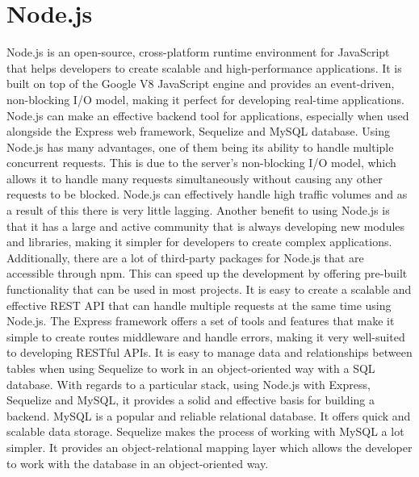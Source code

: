 \section{Node.js}
Node.js is an open-source, cross-platform runtime environment for JavaScript that helps developers to create scalable and high-performance applications. \cite{node} It is built on top of the Google V8 JavaScript engine and provides an event-driven, non-blocking I/O model, making it perfect for developing real-time applications. Node.js can make an effective backend tool for applications, especially when used alongside the Express web framework, Sequelize and MySQL database.
\newline \newline
Using Node.js has many advantages, \cite{nodePro&Cons} one of them being its ability to handle multiple concurrent requests. This is due to the server’s non-blocking I/O model, which allows it to handle many requests simultaneously without causing any other requests to be blocked. Node.js can effectively handle high traffic volumes and as a result of this there is very little lagging. Another benefit to using Node.js is that it has a large and active community that is always developing new modules and libraries, making it simpler for developers to create complex applications. Additionally, there are a lot of third-party packages for Node.js that are accessible through npm. This can speed up the development by offering pre-built functionality that can be used in most projects.
\newline \newline
It is easy to create a scalable and effective REST API that can handle multiple requests at the same time using Node.js. The Express framework offers a set of tools and features that make it simple to create routes middleware and handle errors, making it very well-suited to developing RESTful APIs. It is easy to manage data and relationships between tables when using Sequelize to work in an object-oriented way with a SQL database. With regards to a particular stack, using Node.js with Express, Sequelize and MySQL, it provides a solid and effective basis for building a backend. MySQL is a popular and reliable relational database. It offers quick and scalable data storage. Sequelize makes the process of working with MySQL a lot simpler. It provides an object-relational mapping layer which allows the developer to work with the database in an object-oriented way.
\newline \newline
